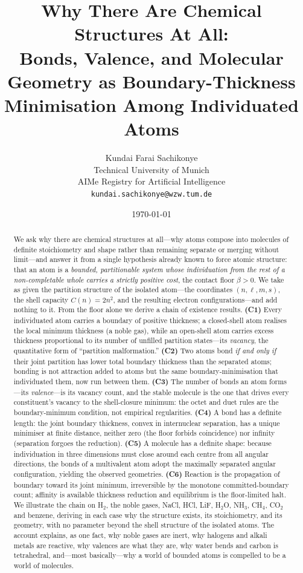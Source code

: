 \documentclass[11pt,a4paper]{article}
\title{\textbf{Why There Are Chemical Structures At All:\\[3pt]
Bonds, Valence, and Molecular Geometry as Boundary-Thickness\\
Minimisation Among Individuated Atoms}}
\author{%
Kundai Farai Sachikonye\\
\small Technical University of Munich\\
\small AIMe Registry for Artificial Intelligence\\
\small \texttt{kundai.sachikonye@wzw.tum.de}}
\date{\today}
\theoremstyle{thmstyle}
\theoremstyle{definition}
\theoremstyle{remark}
\newcommand{\floorc}{\beta}
\newcommand{\Shellcap}{C}
\begin{document}
\maketitle

\begin{abstract}
\noindent
We ask why there are chemical structures at all---why atoms compose into
molecules of definite stoichiometry and shape rather than remaining
separate or merging without limit---and answer it from a single
hypothesis already known to force atomic structure: that an atom is a
\emph{bounded, partitionable system whose individuation from the rest of
a non-completable whole carries a strictly positive cost}, the contact
floor $\floorc>0$. We take as given the partition structure of the
isolated atom---the coordinates $(n,\ell,m,s)$, the shell capacity
$\Shellcap(n)=2n^{2}$, and the resulting electron configurations---and add
nothing to it. From the floor alone we derive a chain of existence
results. \textbf{(C1)} Every individuated atom carries a boundary of
positive thickness; a closed-shell atom realises the local minimum
thickness (a noble gas), while an open-shell atom carries excess
thickness proportional to its number of unfilled partition states---its
\emph{vacancy}, the quantitative form of ``partition malformation.''
\textbf{(C2)} Two atoms bond \emph{if and only if} their joint partition
has lower total boundary thickness than the separated atoms; bonding is
not attraction added to atoms but the same boundary-minimisation that
individuated them, now run between them. \textbf{(C3)} The number of
bonds an atom forms---its \emph{valence}---is its vacancy count, and the
stable molecule is the one that drives every constituent's vacancy to
the shell-closure minimum: the octet and duet rules are the
boundary-minimum condition, not empirical regularities. \textbf{(C4)} A
bond has a definite length: the joint boundary thickness, convex in
internuclear separation, has a unique minimiser at finite distance,
neither zero (the floor forbids coincidence) nor infinity (separation
forgoes the reduction). \textbf{(C5)} A molecule has a definite shape:
because individuation in three dimensions must close around each centre
from all angular directions, the bonds of a multivalent atom adopt the
maximally separated angular configuration, yielding the observed
geometries. \textbf{(C6)} Reaction is the propagation of boundary toward
its joint minimum, irreversible by the monotone committed-boundary
count; affinity is available thickness reduction and equilibrium is the
floor-limited halt. We illustrate the chain on H$_2$, the noble gases,
NaCl, HCl, LiF, H$_2$O, NH$_3$, CH$_4$, CO$_2$ and benzene, deriving in
each case why the structure exists, its stoichiometry, and its geometry,
with no parameter beyond the shell structure of the isolated atoms. The
account explains, as one fact, why noble gases are inert, why halogens
and alkali metals are reactive, why valences are what they are, why
water bends and carbon is tetrahedral, and---most basically---why a world
of bounded atoms is compelled to be a world of molecules.
\end{abstract}
\end{document}
